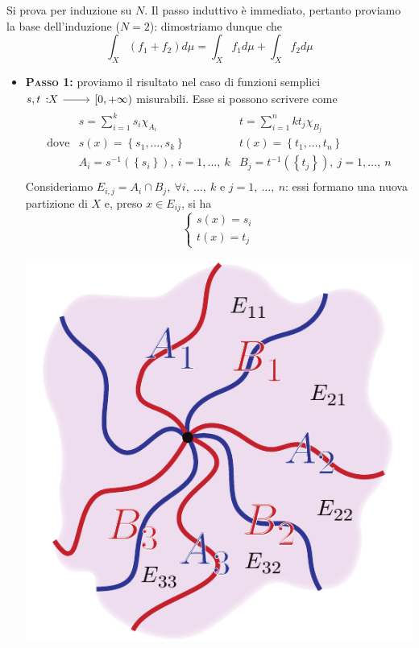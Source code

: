 \begin{demonstration}
	Si prova per induzione su $N$. Il passo induttivo è immediato, pertanto proviamo la base dell'induzione ($N=2$): dimostriamo dunque che
	\begin{equation*}
		\int_X\left(f_1+f_2\right)d\mu=\int_Xf_1d\mu+\int_Xf_2d\mu
	\end{equation*}
		\begin{itemize}
		\item \textbf{\textsc{Passo 1}:} proviamo il risultato nel caso di funzioni semplici $\funz{s,t}{X}{\left[0,+\infty\right)}$ misurabili. Esse si possono scrivere come
		\begin{equation*}
			\begin{array}{lll}
				& \displaystyle s=\sum_{i=1}^{k}s_i\chi_{A_i} & \displaystyle t=\sum_{i=1}^n{k}t_j\chi_{B_j}\\
				\text{dove}& \displaystyle s(x)=\left\{s_1,\ldots,s_k\right\}&\displaystyle t(x)=\left\{t_1,\ldots,t_n\right\}\\
				&\displaystyle A_i=s^{-1}\left(\left\{s_i\right\}\right),\ i=1,\ldots,\ k&\displaystyle B_j=t^{-1}\left(\left\{t_j\right\}\right),\ j=1,\ldots,\ n\\
			\end{array}
		\end{equation*}
	Consideriamo $E_{i,j}=A_i\cap B_j,\ \forall i,\ \ldots,\ k$ e $j=1,\ \ldots,\ n$: essi formano una nuova partizione di $X$ e, preso $x\in E_{ij}$, si ha
	\begin{equation*}
		\begin{cases}
			s(x)=s_i\\
			t(x)=t_j
		\end{cases}
	\end{equation*}
\begin{center}
	\includegraphics[trim=0cm 0cm 0cm 0cm, clip, scale=0.75]{images/additivita}

\end{center}
\end{itemize}
\end{demonstration}
